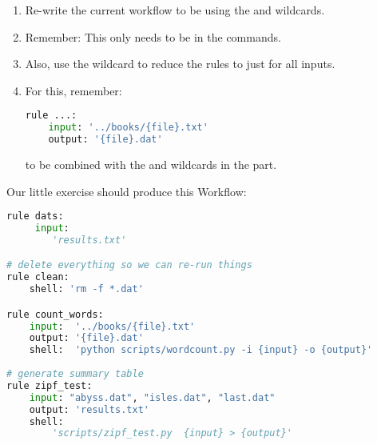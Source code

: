 \begin{frame}[fragile]
  \frametitle{}
  \begin{enumerate}
   \item Re-write the current workflow to be using the  and  wildcards.
   \item Remember: This only needs to be in the  commands.
   \item Also, use the  wildcard to reduce the  rules to just  for all inputs.
   \item For this, remember:
         \begin{lstlisting}[language=Python,style=Python]
rule ...:
    input: '../books/{file}.txt'
    output: '{file}.dat'
         \end{lstlisting}
         to be combined with the  and  wildcards in the  part.
  \end{enumerate}
\end{frame}


\begin{frame}[fragile]
Our little exercise should produce this Workflow:
      \begin{lstlisting}[language=Python,style=Python, basicstyle=\tiny]
rule dats:
     input:
        'results.txt'

# delete everything so we can re-run things
rule clean:
    shell: 'rm -f *.dat'

rule count_words:
    input:  '../books/{file}.txt'
    output: '{file}.dat'
    shell:  'python scripts/wordcount.py -i {input} -o {output}'
    
# generate summary table
rule zipf_test:
    input: "abyss.dat", "isles.dat", "last.dat"
    output: 'results.txt'
    shell:  
        'scripts/zipf_test.py  {input} > {output}'
      \end{lstlisting}

\end{frame}
